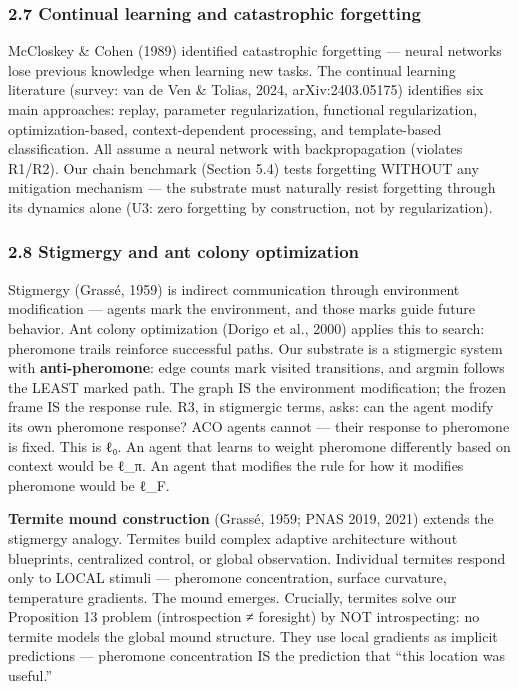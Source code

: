 \documentclass[
  11pt,
]{article}
\begin{document}
\subsubsection{2.7 Continual learning and catastrophic
forgetting}\label{continual-learning-and-catastrophic-forgetting}

McCloskey \& Cohen (1989) identified catastrophic forgetting --- neural
networks lose previous knowledge when learning new tasks. The continual
learning literature (survey: van de Ven \& Tolias, 2024,
arXiv:2403.05175) identifies six main approaches: replay, parameter
regularization, functional regularization, optimization-based,
context-dependent processing, and template-based classification. All
assume a neural network with backpropagation (violates R1/R2). Our chain
benchmark (Section 5.4) tests forgetting WITHOUT any mitigation
mechanism --- the substrate must naturally resist forgetting through its
dynamics alone (U3: zero forgetting by construction, not by
regularization).

\subsubsection{2.8 Stigmergy and ant colony
optimization}\label{stigmergy-and-ant-colony-optimization}

Stigmergy (Grassé, 1959) is indirect communication through environment
modification --- agents mark the environment, and those marks guide
future behavior. Ant colony optimization (Dorigo et al., 2000) applies
this to search: pheromone trails reinforce successful paths. Our
substrate is a stigmergic system with \textbf{anti-pheromone}: edge
counts mark visited transitions, and argmin follows the LEAST marked
path. The graph IS the environment modification; the frozen frame IS the
response rule. R3, in stigmergic terms, asks: can the agent modify its
own pheromone response? ACO agents cannot --- their response to
pheromone is fixed. This is ℓ₀. An agent that learns to weight pheromone
differently based on context would be ℓ\_π. An agent that modifies the
rule for how it modifies pheromone would be ℓ\_F.

\textbf{Termite mound construction} (Grassé, 1959; PNAS 2019, 2021)
extends the stigmergy analogy. Termites build complex adaptive
architecture without blueprints, centralized control, or global
observation. Individual termites respond only to LOCAL stimuli ---
pheromone concentration, surface curvature, temperature gradients. The
mound emerges. Crucially, termites solve our Proposition 13 problem
(introspection ≠ foresight) by NOT introspecting: no termite models the
global mound structure. They use local gradients as implicit predictions
--- pheromone concentration IS the prediction that ``this location was
useful.''
\end{document}

